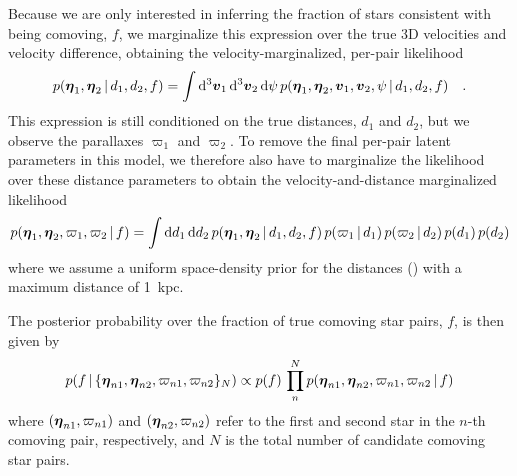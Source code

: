 \documentclass[modern, letterpaper]{aastex61}
\begin{document}
Because we are only interested in inferring the fraction of stars consistent
with being comoving, $f$, we marginalize this expression over the true 3D
velocities and velocity difference, obtaining the velocity-marginalized,
per-pair likelihood
\begin{equation}
    p(\bs{\eta}_1, \bs{\eta}_2 \given d_1, d_2, f) =
    \int \dd^3\bs{v}_1 \, \dd^3\bs{v}_2 \, \dd \psi \,
    p(\bs{\eta}_1, \bs{\eta}_2, \bs{v}_1, \bs{v}_2, \psi \given d_1, d_2, f)
    \quad . \label{eq:vel-marg}
\end{equation}
This expression is still conditioned on the true distances, $d_1$ and $d_2$, but
we observe the parallaxes $\varpi_1$ and $\varpi_2$.
To remove the final per-pair latent parameters in this model, we therefore also
have to marginalize the likelihood over these distance parameters to obtain the
velocity-and-distance marginalized likelihood
\begin{equation}
    p(\bs{\eta}_1, \bs{\eta}_2, \varpi_1, \varpi_2 \given f) =
        \int \dd d_1 \, \dd d_2 \,
        p(\bs{\eta}_1, \bs{\eta}_2 \given d_1, d_2, f) \,
        p(\varpi_1 \given d_1) \, p(\varpi_2 \given d_2) \,
        p(d_1) \, p(d_2)
\end{equation}
where we assume a uniform space-density prior for the distances
(\citealt{Bailer-Jones:2015aa}) with a maximum distance of 1~kpc.

The posterior probability over the fraction of true comoving star pairs, $f$, is
then given by
\begin{equation}
    p(f \given \{\bs{\eta}_{n1}, \bs{\eta}_{n2}, \varpi_{n1}, \varpi_{n2}\}_N)
        \propto p(f) \, \prod_n^N
        p(\bs{\eta}_{n1}, \bs{\eta}_{n2}, \varpi_{n1}, \varpi_{n2} \given f)
\end{equation}
where $(\boldsymbol{\eta}_{n1}, \varpi_{n1})$ and $(\boldsymbol{\eta}_{n2}, \varpi_{n2})$ refer
to the first and second star in the $n$-th comoving pair, respectively, and  $N$
is the total number of candidate comoving star pairs.
\end{document}
